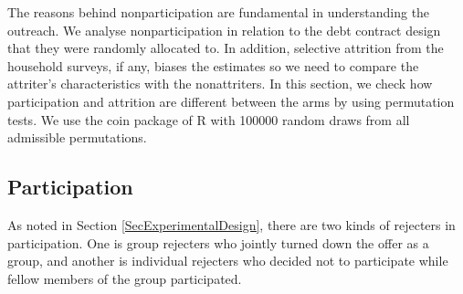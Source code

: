 
	The reasons behind nonparticipation are fundamental in understanding the outreach. We analyse nonparticipation in relation to the debt contract design that they were randomly allocated to. In addition, selective attrition from the household surveys, if any, biases the estimates so we need to compare the attriter's characteristics with the nonattriters. 	In this section, we check how participation and attrition are different between the arms by using permutation tests. We use the \textsf{coin} package of \textsf{R} with 100000 random draws from all admissible permutations. 


\subsection{Participation}
\label{ResultsSectionParticipation}


	As noted in Section \ref{SecExperimentalDesign}, there are two kinds of rejecters in participation. One is group rejecters who jointly turned down the offer as a group, and another is individual rejecters who decided not to participate while fellow members of the group participated. %

